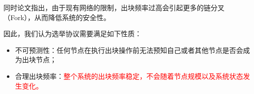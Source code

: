 同时论文\cite{sompolinsky2015secure}指出，由于现有网络的限制，出块频率过高会引起更多的链分叉（Fork），从而降低系统的安全性。

因此，我们认为选举协议需要满足如下性质：

\begin{itemize}
	\item 不可预测性：任何节点在执行出块操作前无法预知自己或者其他节点是否会成为出块节点；
	\item 合理出块频率：\textcolor{red}{整个系统的出块频率稳定，不会随着节点规模以及系统状态发生变化。}
\end{itemize}













